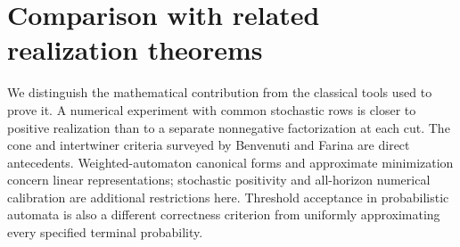 \section{Comparison with related realization theorems}\label{sec:priority52}
We distinguish the mathematical contribution from the classical tools
used to prove it. A numerical experiment with common stochastic rows
is closer to positive realization than to a separate nonnegative
factorization at each cut. The cone and intertwiner criteria surveyed
by Benvenuti and Farina \cite{BF04,BF03} are direct antecedents.
Weighted-automaton canonical forms and approximate minimization
\cite{BPP15} concern linear representations; stochastic positivity and
all-horizon numerical calibration are additional restrictions here.
Threshold acceptance in probabilistic automata \cite{Rabin63} is also
a different correctness criterion from uniformly approximating every
specified terminal probability.

